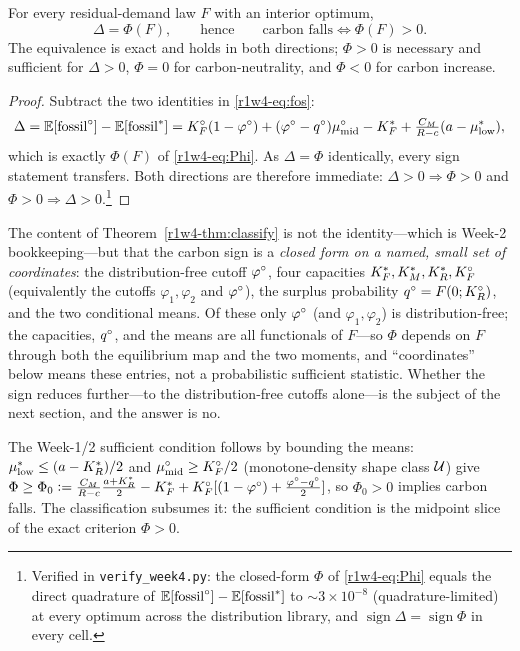 \begin{theorem}\label{r1w4-thm:classify}
For every residual-demand law $F$ with an interior optimum,
\[
  \boxed{\;\Delta=\Phi(F),\qquad\text{hence}\qquad \text{carbon falls}\iff \Phi(F)>0.\;}
\]
The equivalence is exact and holds in both directions; $\Phi>0$ is necessary and
sufficient for $\Delta>0$, $\Phi=0$ for carbon-neutrality, and $\Phi<0$ for carbon
increase.
\end{theorem}

\begin{proof}
Subtract the two identities in \eqref{r1w4-eq:fos}:
\[
  \Delta=\mathbb{E}[\mathrm{fossil}^{\circ}]-\mathbb{E}[\mathrm{fossil}^{*}]
  =K_F^{\circ}(1-\varphi^{\circ})+(\varphi^{\circ}-q^{\circ})\mu^{\circ}_{\mathrm{mid}}-K_F^{*}+\tfrac{C_M}{R-c}(a-\mu^{*}_{\mathrm{low}}),
\]
which is exactly $\Phi(F)$ of \eqref{r1w4-eq:Phi}. As $\Delta=\Phi$ identically, every sign
statement transfers. Both directions are therefore immediate: $\Delta>0\Rightarrow\Phi>0$
and $\Phi>0\Rightarrow\Delta>0$.\footnote{Verified in \texttt{verify\_week4.py}: the
closed-form $\Phi$ of \eqref{r1w4-eq:Phi} equals the direct quadrature of
$\mathbb{E}[\mathrm{fossil}^{\circ}]-\mathbb{E}[\mathrm{fossil}^{*}]$ to $\sim3\times10^{-8}$ (quadrature-limited) at every optimum across the
distribution library, and $\operatorname{sign}\Delta=\operatorname{sign}\Phi$ in every
cell.}
\end{proof}

The content of Theorem~\ref{r1w4-thm:classify} is not the identity---which is Week-2
bookkeeping---but that the carbon sign is a \emph{closed form on a named, small set of
coordinates}: the distribution-free cutoff $\varphi^{\circ}$, four capacities
$K_F^{*},K_M^{*},K_R^{*},K_F^{\circ}$ (equivalently the cutoffs $\varphi_1,\varphi_2$ and $\varphi^{\circ}$), the
surplus probability $q^{\circ}=F(0;K_R^{\circ})$, and the two conditional means. Of these only $\varphi^{\circ}$
(and $\varphi_1,\varphi_2$) is distribution-free; the capacities, $q^{\circ}$, and the means are
all functionals of $F$---so $\Phi$ depends on $F$ through both the equilibrium map and the
two moments, and ``coordinates'' below means these entries, not a probabilistic sufficient
statistic. Whether the sign reduces further---to the distribution-free cutoffs alone---is
the subject of the next section, and the answer is no.

\begin{corollary}\label{r1w4-cor:suff}
The Week-1/2 sufficient condition follows by bounding the means:
$\mu^{*}_{\mathrm{low}}\le(a-K_R^{*})/2$ and $\mu^{\circ}_{\mathrm{mid}}\ge K_F^{\circ}/2$ (monotone-density shape class $\mathcal U$) give
$\Phi\ge\Phi_0\vcentcolon=\tfrac{C_M}{R-c}\tfrac{a+K_R^{*}}{2}-K_F^{*}+K_F^{\circ}[(1-\varphi^{\circ})+\tfrac{\varphi^{\circ}-q^{\circ}}{2}]$,
so $\Phi_0>0$ implies carbon falls. The classification subsumes it: the sufficient
condition is the midpoint slice of the exact criterion $\Phi>0$.
\end{corollary}

